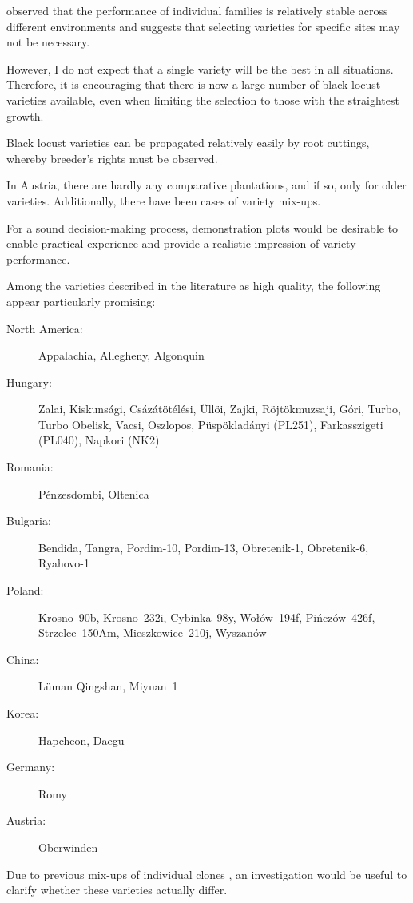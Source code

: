 \citet{bloes1992robinie} observed that the performance of individual families is relatively stable across different environments and suggests that selecting varieties for specific sites may not be necessary.

However, I do not expect that a single variety will be the best in all situations. Therefore, it is encouraging that there is now a large number of black locust varieties available, even when limiting the selection to those with the straightest growth.

Black locust varieties can be propagated relatively easily by root cuttings, whereby breeder’s rights must be observed.

In Austria, there are hardly any comparative plantations, and if so, only for older varieties. Additionally, there have been cases of variety mix-ups.

For a sound decision-making process, demonstration plots would be desirable to enable practical experience and provide a realistic impression of variety performance.

Among the varieties described in the literature as high quality, the following appear particularly promising:

\begin{description}
  \item[North America:] Appalachia, Allegheny, Algonquin
  \item[Hungary:] Zalai, Kiskunsági, Csázátötélési, Üllöi, Zajki, Röjtökmuzsaji, Góri, Turbo, Turbo Obelisk, Vacsi, Oszlopos, Püspökladányi (PL251), Farkasszigeti (PL040), Napkori (NK2)
  \item[Romania:] Pénzesdombi, Oltenica
  \item[Bulgaria:] Bendida, Tangra, Pordim-10, Pordim-13, Obretenik-1, Obretenik-6, Ryahovo-1
  \item[Poland:] Krosno--90b, Krosno--232i, Cybinka--98y, Wołów--194f, Pińczów--426f, Strzelce--150Am, Mieszkowice--210j, Wyszanów
  \item[China:] Lüman Qingshan, Miyuan~1
  \item[Korea:] Hapcheon, Daegu
  \item[Germany:] Romy
  \item[Austria:] Oberwinden
\end{description}

Due to previous mix-ups of individual clones \citep{heinze2014robinie,liesebach2012robinie}, an investigation would be useful to clarify whether these varieties actually differ.

